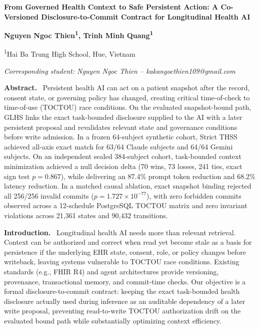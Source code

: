 \documentclass[10pt,letterpaper]{article}
\newcommand{\sectionlead}[1]{\textbf{#1.}\ }
\begin{document}
\begin{center}
{\fontsize{12}{13.2}\selectfont\bfseries
From Governed Health Context to Safe Persistent Action: A Co-Versioned Disclosure-to-Commit Contract for Longitudinal Health AI\par}
\vspace{3pt}
{\fontsize{9.5}{10.5}\selectfont\bfseries
Nguyen Ngoc Thien\textsuperscript{1}, Trinh Minh Quang\textsuperscript{1}\par}
\vspace{1pt}
{\fontsize{9.3}{10.3}\selectfont
\textsuperscript{1}Hai Ba Trung High School, Hue, Vietnam\par}
\vspace{1pt}
{\fontsize{9}{10}\selectfont\itshape Corresponding student: Nguyen Ngoc Thien -- kakangocthien109@gmail.com\par}
\end{center}

\vspace{1pt}
\fontsize{9.5}{10.55}\selectfont
\justifying

\sectionlead{Abstract} Persistent health AI can act on a patient snapshot after the record, consent state, or governing policy has changed, creating critical time-of-check to time-of-use (TOCTOU) race conditions. On the evaluated snapshot-bound path, GLHS links the exact task-bounded disclosure supplied to the AI with a later persistent proposal and revalidates relevant state and governance conditions before write admission. In a frozen 64-subject synthetic cohort, Strict THSS achieved all-axis exact match for 63/64 Claude subjects and 64/64 Gemini subjects. On an independent sealed 384-subject cohort, task-bounded context minimization achieved a null decision delta (70 wins, 73 losses, 241 ties, exact sign test $p=0.867$), while delivering an 87.4\% prompt token reduction and 68.2\% latency reduction. In a matched causal ablation, exact snapshot binding rejected all 256/256 invalid commits ($p = 1.727 \times 10^{-77}$), with zero forbidden commits observed across a 12-schedule PostgreSQL TOCTOU matrix and zero invariant violations across 21,361 states and 90,432 transitions.

\sectionlead{Introduction} Longitudinal health AI needs more than relevant retrieval. Context can be authorized and correct when read yet become stale as a basis for persistence if the underlying EHR state, consent, role, or policy changes before writeback, leaving systems vulnerable to TOCTOU race conditions. Existing standards (e.g., FHIR R4) and agent architectures provide versioning, provenance, transactional memory, and commit-time checks. Our objective is a formal disclosure-to-commit contract: keeping the exact task-bounded health disclosure actually used during inference as an auditable dependency of a later write proposal, preventing read-to-write TOCTOU authorization drift on the evaluated bound path while substantially optimizing context efficiency.
\end{document}

